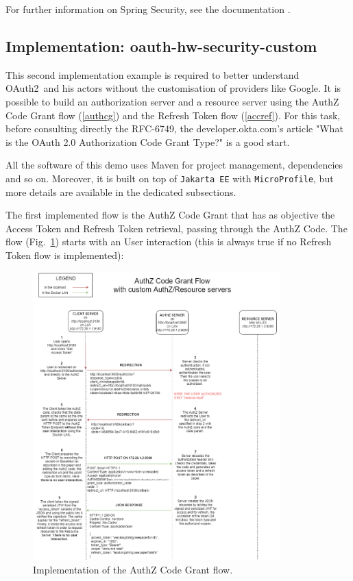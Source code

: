 \documentclass[a4paper,12pt]{article}
\def\oauth{OAuth2\xspace}
\def\myfig#1{Fig.~#1\xspace}
\def\rfc#1{RFC-#1\xspace}
\begin{document}
For further information on Spring Security, see the documentation \cite{sprsec}.

\subsection{Implementation: oauth-hw-security-custom}
This second implementation example is required to better understand \oauth\ and his actors without the customisation of providers like Google. It is possible to build an authorization server and a resource server using the AuthZ Code Grant flow (\ref{authcg}) and the Refresh Token flow (\ref{accref}). For this task, before consulting directly the \rfc{6749}, the developer.okta.com's article "What is the OAuth 2.0 Authorization Code Grant Type?" \cite{oauth2} is a good start. 

All the software of this demo uses Maven for project management, dependencies and so on. Moreover, it is built on top of \texttt{Jakarta EE} \cite{jaksec} with \texttt{MicroProfile}, but more details are available in the dedicated subsections.

The first implemented flow is the AuthZ Code Grant that has as objective the Access Token and Refresh Token retrieval, passing through the AuthZ Code. The flow (\myfig{\ref{fig:access1}}) starts with an User interaction (this is always true if no Refresh Token flow is implemented):

\begin{figure}[ht]
    \centering
    \includegraphics[width=0.85\textwidth]{figures/flow_access1.png}
    \caption{Implementation of the AuthZ Code Grant flow.}
    \label{fig:access1}
\end{figure}
\end{document}
